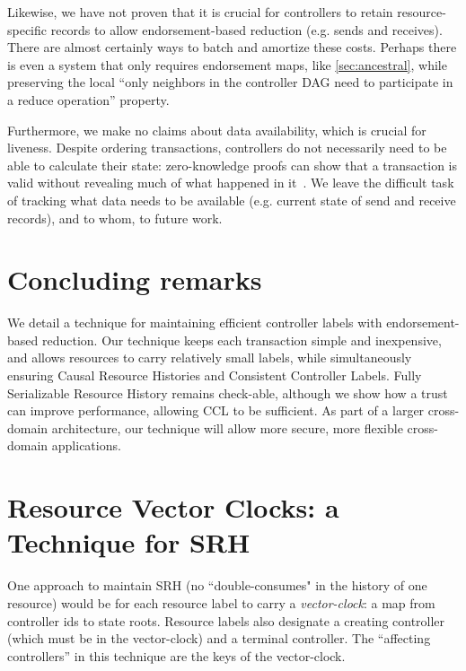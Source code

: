 \documentclass[a4paper,USenglish,cleveref, autoref, thm-restate, anonymous]{lipics-v2021}
\begin{document}
Likewise, we have not proven that it is crucial for controllers to retain resource-specific records to allow endorsement-based reduction (e.g. sends and receives).
There are almost certainly ways to batch and amortize these costs.
Perhaps there is even a system that only requires endorsement maps, like \cref{sec:ancestral}, while preserving the local ``only neighbors in the controller DAG need to participate in a reduce operation'' property. 

Furthermore, we make no claims about data availability, which is crucial for liveness.
Despite ordering transactions, controllers do not necessarily need to be able to calculate their state: zero-knowledge proofs can show that a transaction is valid without revealing much of what happened in it~\cite{nova,resource}.
We leave the difficult task of tracking what data needs to be available (e.g. current state of send and receive records), and to whom, to future work. 

 
\section{Concluding remarks}
We detail a technique for maintaining efficient controller labels with endorsement-based reduction.
Our technique keeps each transaction simple and inexpensive, and allows resources to carry relatively small labels, while simultaneously ensuring Causal Resource Histories and Consistent Controller Labels.
Fully Serializable Resource History remains check-able, although we show how a trust can improve performance, allowing CCL to be sufficient.
As part of a larger cross-domain architecture, our technique will allow more secure, more flexible cross-domain applications.






\appendix


\section{Resource Vector Clocks: a Technique for SRH}
\label{sec:resourcevectorclocks}
One approach to maintain SRH (no ``double-consumes" in the history of one resource) would be for each resource label to carry a \textit{vector-clock}: a map from controller ids to state roots. 
Resource labels also designate a creating controller (which must be in the vector-clock) and a terminal controller.
The ``affecting controllers'' in this technique are the keys of the vector-clock.
\end{document}
